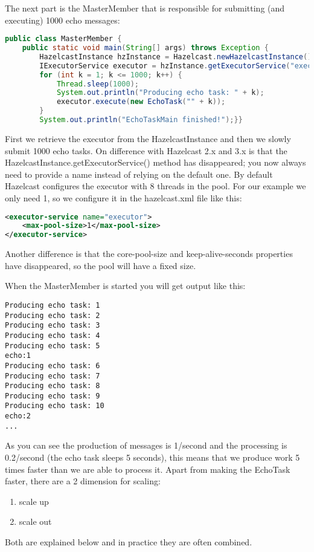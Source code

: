 The next part is the MasterMember that is responsible for submitting (and executing) 1000 echo messages:
\begin{lstlisting}[language=java]
public class MasterMember {
    public static void main(String[] args) throws Exception {
        HazelcastInstance hzInstance = Hazelcast.newHazelcastInstance();
        IExecutorService executor = hzInstance.getExecutorService("executor");
        for (int k = 1; k <= 1000; k++) {
            Thread.sleep(1000);
            System.out.println("Producing echo task: " + k);
            executor.execute(new EchoTask("" + k));
        }
        System.out.println("EchoTaskMain finished!");}}
\end{lstlisting}
First we retrieve the executor from the HazelcastInstance and then we slowly submit 1000 echo tasks. On difference with Hazelcast 2.x and 3.x is that the HazelcastInstance.getExecutorService() method has disappeared; you now always need to provide a name instead of relying on the default one. By default Hazelcast configures the executor with 8 threads in the pool. For our example we only need 1, so we configure it in the hazelcast.xml file like this:
\begin{lstlisting}[language=xml]
<executor-service name="executor">
    <max-pool-size>1</max-pool-size>
</executor-service>
\end{lstlisting}
Another difference is that the core-pool-size and keep-alive-seconds properties have disappeared, so the pool will have a fixed size.

When the MasterMember is started you will get output like this:
\begin{lstlisting}
Producing echo task: 1
Producing echo task: 2
Producing echo task: 3
Producing echo task: 4
Producing echo task: 5
echo:1
Producing echo task: 6
Producing echo task: 7
Producing echo task: 8
Producing echo task: 9
Producing echo task: 10
echo:2
...
\end{lstlisting}
As you can see the production of messages is 1/second and the processing is 0.2/second (the echo task sleeps 5 seconds), this means that we produce work 5 times faster than we are able to process it. Apart from making the EchoTask faster, there are a 2 dimension for scaling:
\begin{enumerate}
\item scale up 
\item scale out
\end{enumerate}
Both are explained below and in practice they are often combined. 


